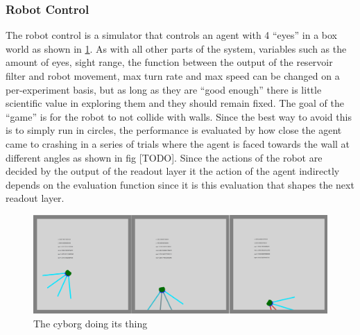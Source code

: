 \subsubsection{Robot Control}
The robot control is a simulator that controls an agent with 4 ``eyes'' in a box
world as shown in \ref{figGame}.
As with all other parts of the system, variables such as the amount of eyes, sight
range, the function between the output of the reservoir filter and robot
movement, max turn rate and max speed can be changed on a per-experiment basis,
but as long as they are ``good enough'' there is little scientific value in
exploring them and they should remain fixed.
The goal of the ``game'' is for the robot to not collide with walls.
Since the best way to avoid this is to simply run in circles, the performance is
evaluated by how close the agent came to crashing in a series of trials where
the agent is faced towards the wall at different angles as shown in fig [TODO].
Since the actions of the robot are decided by the output of the readout layer it
the action of the agent indirectly depends on the evaluation function since it
is this evaluation that shapes the next readout layer.
\begin{figure}[h!]
  \centering
  \includegraphics[width=1\textwidth]{fig/TAC/game2.png}
  \caption{The cyborg doing its thing}
  \label{figGame}
\end{figure}
